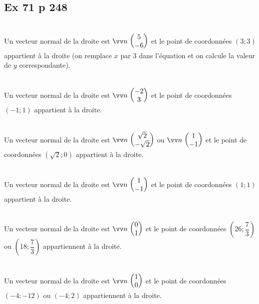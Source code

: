 \documentclass[12pt,a4paper]{book}
\begin{document}
\subsection*{Ex 71 p 248}
\begin{enumMet}
    \item {}\\
    Un vecteur normal de la droite est $\Coord{n}{5}{-6}$ et le point de coordonnées $\left(3 ; 3\right)$ appartient à la droite (on remplace $x$ par $3$ dans l'équation et on calcule la valeur de $y$ correspondante).
    \item {}\\
    Un vecteur normal de la droite est $\Coord{n}{-2}{3}$ et le point de coordonnées $(-1 ; 1)$ appartient à la droite.
    \item {}\\
    Un vecteur normal de la droite est $\Coord{n}{\sqrt{2}}{-\sqrt{2}}$ ou $\Coord{n}{1}{-1}$ et le point de coordonnées $\left(\sqrt{2};0\right)$ appartient à la droite.
    \item {}\\
    Un vecteur normal de la droite est $\Coord{n}{1}{-1}$ et le point de coordonnées $(1 ; 1)$ appartient à la droite.
    \item {}\\
    Un vecteur normal de la droite est $\Coord{n}{0}{1}$ et le point de coordonnées $\left(26 ; \dfrac{7}{3}\right)$ ou $\left(18 ; \dfrac{7}{3}\right)$ appartiennent à la droite.
    \item {}\\
    Un vecteur normal de la droite est $\Coord{n}{1}{0}$ et le point de coordonnées $(-4 ;-12)$ ou $(-4 ;2)$ appartiennent à la droite.    
\end{enumMet}
\end{document}
